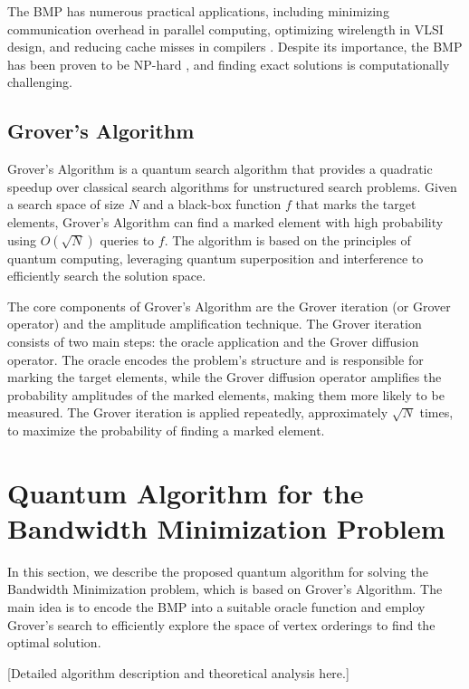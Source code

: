The BMP has numerous practical applications, including minimizing communication overhead in parallel computing, optimizing wirelength in VLSI design, and reducing cache misses in compilers \cite{bmp_applications}. Despite its importance, the BMP has been proven to be NP-hard \cite{bmp_nphard}, and finding exact solutions is computationally challenging.

\subsection{Grover's Algorithm}
\label{subsec:grover}

Grover's Algorithm \cite{grover} is a quantum search algorithm that provides a quadratic speedup over classical search algorithms for unstructured search problems. Given a search space of size $N$ and a black-box function $f$ that marks the target elements, Grover's Algorithm can find a marked element with high probability using $O(\sqrt{N})$ queries to $f$. The algorithm is based on the principles of quantum computing, leveraging quantum superposition and interference to efficiently search the solution space.

The core components of Grover's Algorithm are the Grover iteration (or Grover operator) and the amplitude amplification technique. The Grover iteration consists of two main steps: the oracle application and the Grover diffusion operator. The oracle encodes the problem's structure and is responsible for marking the target elements, while the Grover diffusion operator amplifies the probability amplitudes of the marked elements, making them more likely to be measured. The Grover iteration is applied repeatedly, approximately $\sqrt{N}$ times, to maximize the probability of finding a marked element.

\section{Quantum Algorithm for the Bandwidth Minimization Problem}
\label{sec:algorithm}

In this section, we describe the proposed quantum algorithm for solving the Bandwidth Minimization problem, which is based on Grover's Algorithm. The main idea is to encode the BMP into a suitable oracle function and employ Grover's search to efficiently explore the space of vertex orderings to find the optimal solution.

[Detailed algorithm description and theoretical analysis here.]

